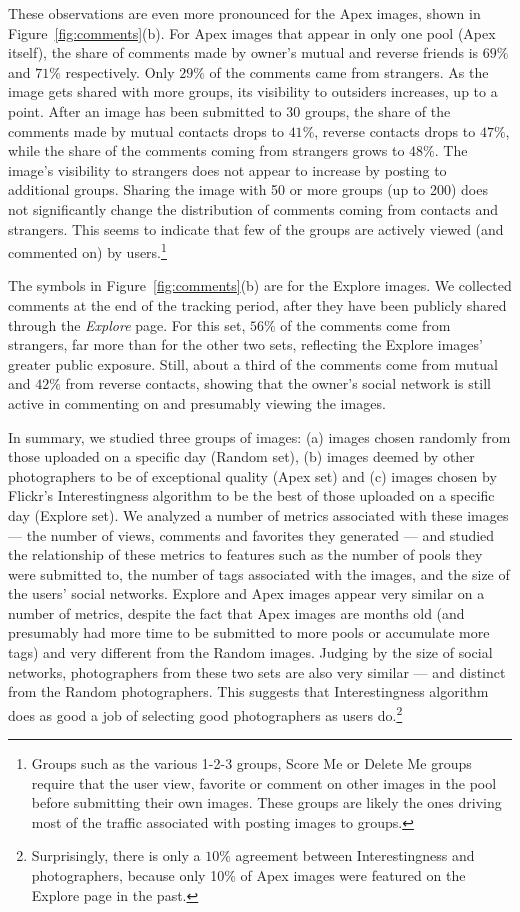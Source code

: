 \documentclass[]{article}
\newcommand{\source}[1]{\textsf{#1}}
\newcommand{\figref}[1]{Figure~\ref{#1}}
\begin{document}
These observations are even more pronounced for the \source{Apex}
images, shown in \figref{fig:comments}(b). For \source{Apex} images
that appear in only one pool (\source{Apex} itself), the share of
comments made by owner's mutual and reverse friends is
$69\%$ and $71\%$ respectively. Only $29\%$ of the comments came
from strangers. As the image gets shared with more groups, its
visibility to outsiders increases, up to a point. After an image has
been submitted to 30 groups, the share of the comments made by
mutual contacts drops to $41\%$, reverse contacts drops to $47\%$,
while the share of the comments coming from strangers grows to
$48\%$. The image's visibility to strangers does not appear to
increase by posting to additional groups. Sharing the image with 50
or more groups (up to 200) does not significantly change the
distribution of comments coming from contacts and strangers. This
seems to indicate that few of the groups are actively viewed (and
commented on) by users.\footnote{Groups such as the various 1-2-3
groups, Score Me or Delete Me groups require that the user view,
favorite or comment on other images in the pool before submitting
their own images. These groups are likely the ones driving most of
the traffic associated with posting images to groups.}

The symbols in \figref{fig:comments}(b) are for the \source{Explore}
images. We collected comments at the end of the tracking period,
after they have been publicly shared through the \emph{Explore} page. For
this set, $56\%$ of the comments come from strangers, far more than
for the other two sets, reflecting the \source{Explore} images'
greater public exposure. Still, about a third of the comments come
from mutual and $42\%$ from reverse contacts, showing that the
owner's social network is still active in commenting on and
presumably viewing the images.

In summary, we studied three groups of images: (a) images chosen
randomly from those uploaded on a specific day (\source{Random}
set), (b) images deemed by other photographers to be of exceptional
quality (\source{Apex} set) and (c) images chosen by Flickr's
Interestingness algorithm to be the best of those uploaded on a
specific day (\source{Explore} set). We analyzed a number of metrics
associated with these images --- the number of views, comments and
favorites they generated --- and studied the relationship of these
metrics to features such as the number of pools they were submitted
to, the number of tags associated with the images, and the size of
the users' social networks. \source{Explore} and \source{Apex}
images appear very similar on a number of metrics, despite the fact
that \source{Apex} images are months old (and presumably had more
time to be submitted to more pools or accumulate more tags) and very
different from the \source{Random} images. Judging by the size of
social networks, photographers from these two sets are also very
similar --- and distinct from the \source{Random} photographers.
This suggests that Interestingness algorithm does as good a job of
selecting good photographers as users do.\footnote{Surprisingly,
there is only a $10\%$ agreement between Interestingness and
photographers, because only 10\% of \source{Apex} images were
featured on the Explore page in the past.}
\end{document}
